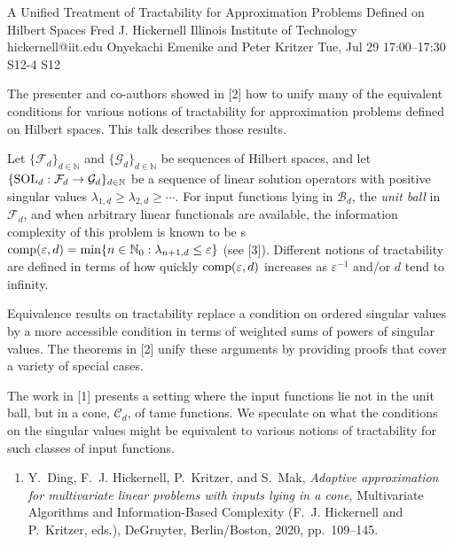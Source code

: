 \documentclass[12pt,lettersize,oneside]{book} %
\begin{document}
\begin{talk}
  {A Unified Treatment of Tractability for Approximation Problems Defined on Hilbert Spaces}%
  {Fred J. Hickernell}%
  {Illinois Institute of Technology}%
  {hickernell@iit.edu}%
  {Onyekachi Emenike and Peter Kritzer}%
  {}%
  {Tue, Jul 29 17:00--17:30}%
  {S12-4}%
  {S12}%
  
    
   
The presenter and co-authors showed in [2] how to unify many of the equivalent conditions for various notions of tractability for approximation problems defined on Hilbert spaces.  This talk describes those results.

Let $\{\mathcal{F}_d\}_{d \in \mathbb{N}}$ and $\{\mathcal{G}_d\}_{d \in \mathbb{N}}$ be sequences of Hilbert spaces, and let $\{\textup{SOL}_d : \mathcal{F}_d \to \mathcal{G}_d\}_{d \in \mathbb{N}}$ be a sequence of linear solution operators  with positive singular values $\lambda_{1,d} \ge \lambda_{2,d} \ge \cdots$.  For input functions lying in $\mathcal{B}_d$, the \emph{unit ball} in $\mathcal{F}_d$, and when arbitrary linear functionals are available, the information complexity of this problem is known to be s$\textup{comp}(\varepsilon, d) = \min \{n \in \mathbb{N}_0 : \lambda_{n+1, d} \le \varepsilon\}$ (see [3]).  Different notions of tractability are defined in terms of how quickly $\textup{comp}(\varepsilon, d)$  increases as $\varepsilon^{-1}$ and/or $d$ tend to infinity.

Equivalence results on tractability replace a condition on ordered singular values by a more accessible condition in terms of weighted sums of powers of singular values.  The theorems in [2] unify these arguments by providing proofs that cover a variety of special cases.

The work in [1] presents a setting where the input functions lie not in the unit ball, but in a cone, $\mathcal{C}_d$, of tame functions.  We speculate on what the conditions on the  singular values might be equivalent to various notions of tractability for such classes of input functions.

\begin{enumerate}
\renewcommand{\labelenumi}{[\arabic{enumi}]}
    \item
Y.~Ding, F.~J. Hickernell, P.~Kritzer, and S.~Mak, \emph{Adaptive approximation for multivariate linear problems with inputs lying in a cone}, Multivariate Algorithms and Information-Based Complexity (F.~J. Hickernell and P.~Kritzer, eds.), DeGruyter, Berlin/Boston, 2020, pp.~109--145.


\end{enumerate}
\end{talk}
\end{document}
